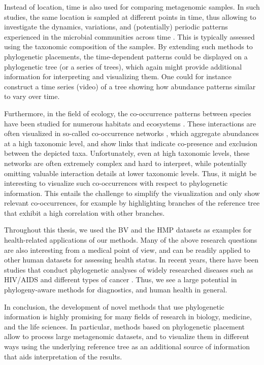 Instead of location, time is also used for comparing metagenomic samples.
In such studies, the same location is sampled at different points in time,
thus allowing to investigate the dynamics, variations, and (potentially) periodic patterns
experienced in the microbial communities across time \cite{Costello2009,Faust2015}.
This is typically assessed using the taxonomic composition of the samples.
By extending such methods to phylogenetic placements,
the time-dependent patterns could be displayed on a phylogenetic tree (or a series of trees),
which again might provide additional information for interpreting and visualizing them.
One could for instance construct a time series (video) of a tree showing
how abundance patterns similar to  vary over time.

Furthermore, in the field of ecology, the co-occurrence patterns between species
have been studied for numerous habitats and ecosystems \cite{Lima-Mendez2015,Villalobos2017,Zelezniak2015}.
These interactions are often visualized in so-called co-occurrence networks \cite{Chaffron2010,Faust2012},
which aggregate abundances at a high taxonomic level,
and show links that indicate co-presence and exclusion between the depicted taxa.
Unfortunately, even at high taxonomic levels, these networks are often extremely complex and hard to interpret,
while potentially omitting valuable interaction details at lower taxonomic levels.
Thus, it might be interesting to visualize such co-occurrences with respect to phylogenetic information.
This entails the challenge to simplify the visualization and only show relevant co-occurrences,
for example by highlighting branches of the reference tree that exhibit a high correlation with other branches.

Throughout this thesis, we used the \acf{BV} \cite{Srinivasan2012} and the \acf{HMP} \citep{Huttenhower2012,Methe2012}
datasets as examples for health-related applications of our methods.
Many of the above research questions are also interesting from a medical point of view,
and can be readily applied to other human datasets for assessing health status.
In recent years, there have been studies that conduct phylogenetic analyses of widely researched diseases
such as HIV/AIDS \cite{Castro-Nallar2012,Brenner2013,Ratmann2017} and different types of cancer \cite{Brown2017a,Abbosh2017}.
Thus, we see a large potential in phylogeny-aware methods for diagnostics, and human health in general.

In conclusion, the development of novel methods that use phylogenetic information
is highly promising for many fields of research in biology, medicine, and the life sciences.
In particular, methods based on phylogenetic placement allow to process large metagenomic datasets,
and to visualize them in different ways using the underlying reference tree as an additional source
of information that aids interpretation of the results.
